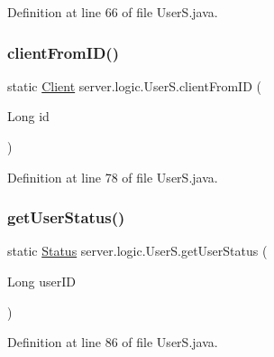 Definition at line 66 of file User\+S.\+java.

\hypertarget{classserver_1_1logic_1_1_user_s_a7354c12a31c65083b69948d05f80e6f9}{}\label{classserver_1_1logic_1_1_user_s_a7354c12a31c65083b69948d05f80e6f9} 
\subsubsection{\texorpdfstring{client\+From\+I\+D()}{clientFromID()}}
{\footnotesize\ttfamily static \hyperlink{classserver_1_1conn_1_1_client}{Client} server.\+logic.\+User\+S.\+client\+From\+ID (\begin{DoxyParamCaption}\item[{Long}]{id }\end{DoxyParamCaption})\hspace{0.3cm}{\ttfamily [static]}}



Definition at line 78 of file User\+S.\+java.

\hypertarget{classserver_1_1logic_1_1_user_s_aca1a627420cd9ac49fba056463da1a18}{}\label{classserver_1_1logic_1_1_user_s_aca1a627420cd9ac49fba056463da1a18} 
\subsubsection{\texorpdfstring{get\+User\+Status()}{getUserStatus()}}
{\footnotesize\ttfamily static \hyperlink{enumsharedlib_1_1tuples_1_1_user_info_1_1_status}{Status} server.\+logic.\+User\+S.\+get\+User\+Status (\begin{DoxyParamCaption}\item[{Long}]{user\+ID }\end{DoxyParamCaption})\hspace{0.3cm}{\ttfamily [static]}}



Definition at line 86 of file User\+S.\+java.

\hypertarget{classserver_1_1logic_1_1_user_s_a255ddb6691b401afd62850350176ae1a}{}\label{classserver_1_1logic_1_1_user_s_a255ddb6691b401afd62850350176ae1a} 
